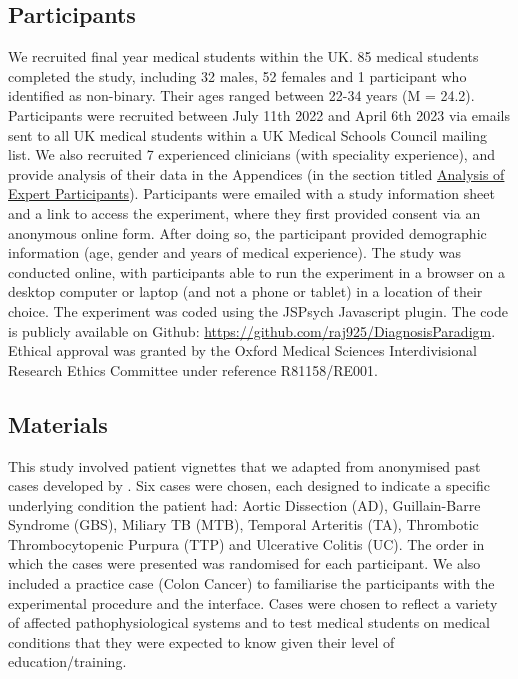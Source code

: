 \documentclass[a4paper, nobind]{templates/ociamthesis}
\begin{document}
\subsection{Participants}\label{participants}

We recruited final year medical students within the UK. 85 medical students completed the study, including 32 males, 52 females and 1 participant who identified as non-binary. Their ages ranged between 22-34 years (M = 24.2). Participants were recruited between July 11th 2022 and April 6th 2023 via emails sent to all UK medical students within a UK Medical Schools Council mailing list. We also recruited 7 experienced clinicians (with speciality experience), and provide analysis of their data in the Appendices (in the section titled \hyperref[experts]{Analysis of Expert Participants}). Participants were emailed with a study information sheet and a link to access the experiment, where they first provided consent via an anonymous online form. After doing so, the participant provided demographic information (age, gender and years of medical experience). The study was conducted online, with participants able to run the experiment in a browser on a desktop computer or laptop (and not a phone or tablet) in a location of their choice. The experiment was coded using the JSPsych Javascript plugin. The code is publicly available on Github: \url{https://github.com/raj925/DiagnosisParadigm}. Ethical approval was granted by the Oxford Medical Sciences Interdivisional Research Ethics Committee under reference R81158/RE001.

\subsection{Materials}\label{materials}

This study involved patient vignettes that we adapted from anonymised past cases developed by \textcite{friedman_are_2001}. Six cases were chosen, each designed to indicate a specific underlying condition the patient had: Aortic Dissection (AD), Guillain-Barre Syndrome (GBS), Miliary TB (MTB), Temporal Arteritis (TA), Thrombotic Thrombocytopenic Purpura (TTP) and Ulcerative Colitis (UC). The order in which the cases were presented was randomised for each participant. We also included a practice case (Colon Cancer) to familiarise the participants with the experimental procedure and the interface. Cases were chosen to reflect a variety of affected pathophysiological systems and to test medical students on medical conditions that they were expected to know given their level of education/training.\\
\end{document}
